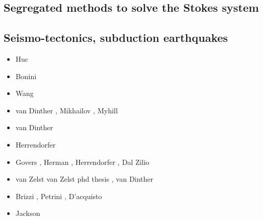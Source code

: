 \subsection{Segregated methods to solve the Stokes system}

\begin{scriptsize}
\cite{raju91}
\cite{haeh93}
\cite{leru95}
\cite{duto98}
\cite{wade03}
\cite{wade04}
\cite{utne08}
\end{scriptsize}

\subsection{Seismo-tectonics, subduction earthquakes}

\begin{scriptsize}
\begin{itemize}
\item[\nineteenninetyeight] Huc \etal \cite{huhc98}
\item[\twothousandthree] Bonini \etal \cite{bocs03}
\item[\twothousandtwelve] Wang \etal \cite{wahh12}
\item[\twothousandthirteen] van Dinther \etal \cite{vagd13a,vagd13b}, Mikhailov \cite{milp13},
                            Myhill \cite{myhi13}
\item[\twothousandfourteen] van Dinther \etal \cite{vamd14}
\item[\twothousandfifteen] Herrendorfer \etal \cite{hevg15}
\item[\twothousandeighteen] Govers \etal \cite{gofv18}, Herman \etal \cite{hefg18}, 
                            Herrendorfer \etal \cite{hegv18}, Dal Zilio \etal \cite{davg18}
\item[\twothousandnineteen] van Zelst \etal \cite{vawg19} van Zelst phd thesis \cite{vanzelst},
                            van Dinther \etal \cite{vakf19}
\item[\twothousandtwenty] Brizzi \etal \cite{brvf20}, Petrini \etal \cite{pegy20}, 
                          D'acquisto \etal \cite{dadm20} 
\item[\twothousandtwentyone] Jackson \etal \cite{jamp21}
\end{itemize}
\end{scriptsize}

